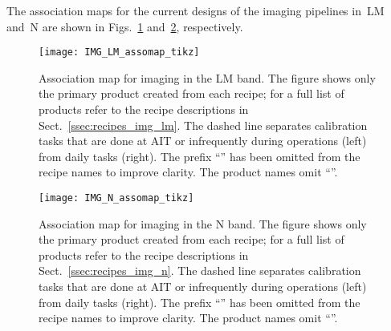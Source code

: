 The association maps for the current designs of the imaging pipelines
in~LM and~N are shown in Figs.~\ref{fig:IMG_LM_Assomap}
and~\ref{fig:IMG_N_Assomap}, respectively.


\begin{landscape}
  \begin{figure}
    \centering
    \texttt{[image: IMG\_LM\_assomap\_tikz]}
    \caption[Reduction cascade and association map for imaing in L and
      M]{Association map for imaging in the LM band. The figure shows only
      the primary product created from each recipe; for a full list of
      products refer to the recipe descriptions in
      Sect.~\ref{ssec:recipes_img_lm}. The dashed line separates
      calibration tasks that are done at AIT or infrequently during
      operations (left) from daily tasks (right). The prefix ``'' has been
      omitted from the recipe names to improve clarity. The product
      names omit ``''.}
    \label{fig:IMG_LM_Assomap}
  \end{figure}
\end{landscape}

\begin{landscape}
\begin{figure}
  \centering
    \texttt{[image: IMG\_N\_assomap\_tikz]}
    \caption[Reduction cascade and association map for imaing in N]{%
      Association map for imaging in the N band. The figure shows
      only the primary product created from each recipe; for a full
      list of products refer to the recipe descriptions in
      Sect.~\ref{ssec:recipes_img_n}. The dashed line separates
      calibration tasks that are done at AIT or infrequently during
      operations (left) from daily tasks (right). The prefix ``'' has
      been omitted from the recipe names to improve clarity. The
      product names omit ``''.}
    \label{fig:IMG_N_Assomap}
  \end{figure}
\end{landscape}

